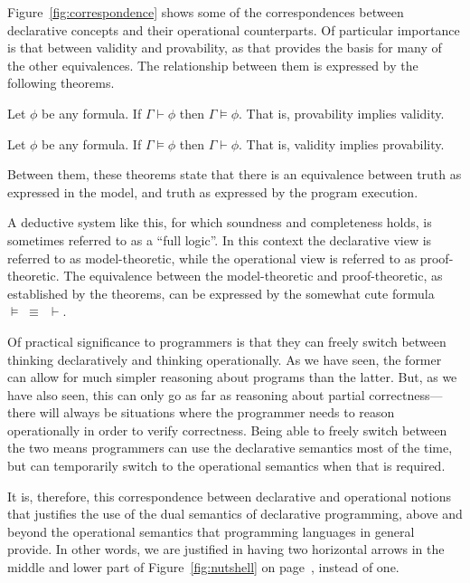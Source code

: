 Figure~\ref{fig:correspondence} shows some of the correspondences
between declarative concepts and their operational counterparts.
Of particular importance is that between validity and provability,
as that provides the basis for many of the other equivalences.
The relationship between them
is expressed by the following theorems.

\begin{theorem}[Soundness] \label{thm:soundness}
Let $\phi$ be any formula.
If\: $\Gamma \vdash \phi$ then $\Gamma \models \phi$.
That is, provability implies validity.
\end{theorem}

\begin{theorem}[Completeness] \label{thm:completeness}
Let $\phi$ be any formula.
If\: $\Gamma \models \phi$ then $\Gamma \vdash \phi$.
That is, validity implies provability.
\end{theorem}

\noindent
Between them,
these theorems state that there is an equivalence between
truth as expressed in the model,
and truth as expressed by the program execution.

A deductive system like this,
for which soundness and completeness holds,
is sometimes referred to as a ``full logic\label{gi:full-logic}''.
In this context the declarative view
is referred to as model-theoretic,
while the operational view
is referred to as proof-theoretic.
The equivalence between the model-theoretic and proof-theoretic,
as established by the theorems,
can be expressed by the somewhat cute formula
$\models\; \equiv\;\, \vdash$.

Of practical significance to programmers
is that they can freely switch between
thinking declaratively and thinking operationally.
As we have seen, the former can allow for
much simpler reasoning about programs than the latter.
But, as we have also seen,
this can only go as far as reasoning about partial correctness---%
there will always be situations where
the programmer needs to reason operationally in order to verify correctness.
Being able to freely switch between the two means programmers
can use the declarative semantics most of the time,
but can temporarily switch to the operational semantics when that is required.

It is, therefore,
this correspondence between declarative and operational notions
that justifies the use of the dual semantics of declarative programming,
above and beyond the operational semantics
that programming languages in general provide.
In other words,
we are justified in having two horizontal arrows
in the middle and lower part of Figure~\ref{fig:nutshell}
on page~\pageref{fig:nutshell},
instead of one.

